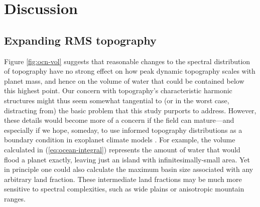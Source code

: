 \documentclass[trackchanges]{aastex63}
\begin{document}
\section{Discussion}
\label{sec:discussion}

\subsection{Expanding RMS topography} \label{sec:discussion-spectrum}

Figure \ref{fig:ocn-vol} suggests that reasonable changes to the spectral distribution of topography have no strong effect on how peak dynamic topography scales with planet mass, and hence on the volume of water that could be contained below this highest point. Our concern with topography's characteristic harmonic structures might thus seem somewhat tangential to (or in the worst case, distracting from) the basic problem that this study purports to address. However, these details would become more of a concern if the field can mature---and especially if we hope, someday, to use informed topography distributions as a boundary condition in exoplanet climate models \citep[e.g.,][]{turbet_habitability_2016, rushby_effect_2019}. For example, the volume calculated in (\ref{eq:ocean-integral}) represents the amount of water that would flood a planet exactly, leaving just an island with infinitesimally-small area. Yet in principle one could also calculate the maximum basin size associated with any arbitrary land fraction. These intermediate land fractions may be much more sensitive to spectral complexities, such as wide plains or anisotropic mountain ranges.
\end{document}
